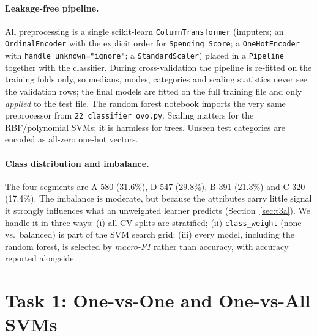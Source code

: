 \documentclass[11pt]{article}
\begin{document}
\paragraph{Leakage-free pipeline.} All preprocessing is a single scikit-learn
\texttt{ColumnTransformer} (imputers; an \texttt{OrdinalEncoder} with the explicit order for
\texttt{Spending\_Score}; a \texttt{OneHotEncoder} with \texttt{handle\_unknown="ignore"}; a
\texttt{StandardScaler})
placed in a \texttt{Pipeline} together with the classifier. During cross-validation the pipeline is
re-fitted on the training folds only, so medians, modes, categories and scaling statistics never see
the validation rows; the final models are fitted on the full training file and only \emph{applied}
to the test file. The random forest notebook imports the very same preprocessor from
\texttt{22\_classifier\_ovo.py}. Scaling matters for the RBF/polynomial SVMs; it is harmless for
trees. Unseen test categories are encoded as all-zero one-hot vectors.

\paragraph{Class distribution and imbalance.} The four segments are A 580 (31.6\%), D 547 (29.8\%),
B 391 (21.3\%) and C 320 (17.4\%). The imbalance is moderate, but because the attributes carry
little signal it strongly influences what an unweighted learner predicts (Section~\ref{sec:t3a}).
We handle it in three ways: (i) all CV splits are stratified; (ii) \texttt{class\_weight} (none
vs.\ balanced) is part of the SVM search grid; (iii) every model, including the random forest, is
selected by \emph{macro-F1} rather than accuracy, with accuracy reported alongside.

\section{Task 1: One-vs-One and One-vs-All SVMs}
\end{document}
